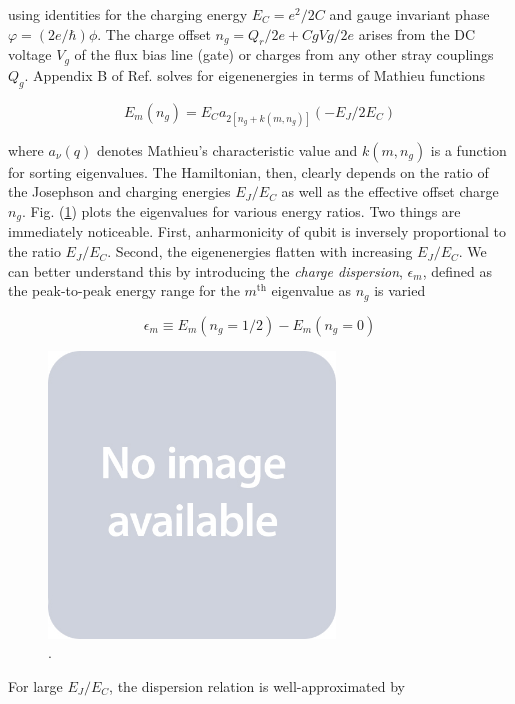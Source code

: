 \documentclass[12 pt]{book}
\begin{document}
using identities for the charging energy $E_C=e^2/2C$ and gauge invariant phase $\varphi=(2e/\hbar)\phi$. The charge offset $n_g=Q_r/2e+CgVg/2e$ arises from the DC voltage $V_g$ of the flux bias line (gate) or charges from any other stray couplings $Q_g$. Appendix B of Ref. \cite{Koch} solves for eigenenergies in terms of Mathieu functions

\begin{equation}
E_m(n_g)=E_C a_{2[n_g+k(m,n_g)]}(-E_J/2E_C)
\end{equation}

where $a_\nu(q)$ denotes Mathieu's characteristic value and $k(m, n_g)$ is a function for sorting eigenvalues. The Hamiltonian, then, clearly depends on the ratio of the Josephson and charging energies $E_J/E_C$ as well as the effective offset charge $n_g$. Fig. (\ref{fig:KochEigenenergies}) plots the eigenvalues for various energy ratios. Two things are immediately noticeable. First, anharmonicity of qubit is inversely proportional to the ratio $E_J/E_C$. Second, the eigenenergies flatten with increasing $E_J/E_C$. We can better understand this by introducing the \emph{charge dispersion}, $\epsilon_m$, defined as the peak-to-peak energy range for the $m^{\mathrm{th}}$ eigenvalue as $n_g$ is varied

\begin{equation}\label{eq:ChargeDispersion}
\epsilon_m \equiv E_m(n_g=1/2)-E_m(n_g=0)
\end{equation}

\begin{figure}[h] 
   \centering
   \includegraphics[width=3in]{placeholder.jpg} 
   \caption{ \cite{Koch}.}
   \label{fig:KochEigenenergies}
\end{figure}

For large $E_J/E_C$, the dispersion relation is well-approximated by
\end{document}
